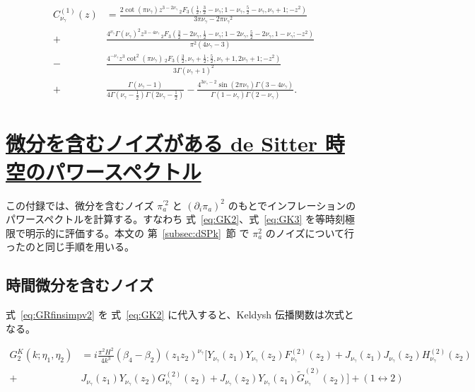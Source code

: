 \documentclass[a4paper,11pt]{ltjsarticle}
\newcommand{\sectionlink}[1]{\section[#1]{\hyperlink{toc}{#1}}}
\numberwithin{equation}{section}
\def\pia{\pi_{a}}
\newcommand{\Eq}[1]{Eq.~(\ref{#1})}
\newcommand{\Sec}[1]{Sec.~\ref{#1}}
\renewcommand{\Eq}[1]{式~\eqref{#1}}
\renewcommand{\Sec}[1]{第~\ref{#1}~節}
\begin{document}
\begin{align}
 \label{eq:Hbeta}
C^{(1)}_{\nu_\gamma}(z) &= \frac{2 \cot (\pi  {\nu_\gamma} ) z^{3-2 {\nu_\gamma} } \, _2F_3\left(\frac{1}{2},\frac{3}{2}-{\nu_\gamma} ;1-{\nu_\gamma} ,\frac{5}{2}-{\nu_\gamma} ,{\nu_\gamma} +1;-z^2\right)}{3 \pi  {\nu_\gamma} -2 \pi  {\nu_\gamma} ^2} \nonumber \\
+&\frac{4^{{\nu_\gamma} } \Gamma ({\nu_\gamma} )^2 z^{3-4 {\nu_\gamma} } \, _2F_3\left(\frac{3}{2}-2 {\nu_\gamma} ,\frac{1}{2}-{\nu_\gamma} ;1-2 {\nu_\gamma} ,\frac{5}{2}-2 {\nu_\gamma} ,1-{\nu_\gamma} ;-z^2\right)}{\pi ^2 (4 {\nu_\gamma} -3)}\nonumber\\
-&\frac{4^{-{\nu_\gamma} } z^3 \cot ^2(\pi  {\nu_\gamma} ) \, _2F_3\left(\frac{3}{2},{\nu_\gamma} +\frac{1}{2};\frac{5}{2},{\nu_\gamma} +1,2 {\nu_\gamma} +1;-z^2\right)}{3 \Gamma ({\nu_\gamma} +1)^2}\nonumber \\
+&\frac{\Gamma ({\nu_\gamma} -1)}{4 \Gamma \left({\nu_\gamma} -\frac{1}{2}\right) \Gamma \left(2 {\nu_\gamma} -\frac{1}{2}\right)}-\frac{4^{3 {\nu_\gamma} -2} \sin (2 \pi  {\nu_\gamma} ) \Gamma (3-4 {\nu_\gamma} )}{\Gamma (1-{\nu_\gamma} ) \Gamma (2-{\nu_\gamma} )}.
\end{align}

\sectionlink{微分を含むノイズがある de Sitter 時空のパワースペクトル}\label{app:Pk}

この付録では、微分を含むノイズ $\pia^{\prime2}$ と $\left(\partial_i\pia\right)^2$ のもとでインフレーションのパワースペクトルを計算する。すなわち \Eq{eq:GK2}、\Eq{eq:GK3} を等時刻極限で明示的に評価する。本文の \Sec{subsec:dSPk} で $\pia^2$ のノイズについて行ったのと同じ手順を用いる。

\subsection*{時間微分を含むノイズ}

\Eq{eq:GRfinsimpv2} を \Eq{eq:GK2} に代入すると、Keldysh 伝播関数は次式となる。

\begin{align}
    G^K_2(k;\eta_1,\eta_2) &= i\frac{\pi^2  H^2}{4 k^3} (\beta_4 - \beta_2 ) (z_1 z_2)^{\nu_\gamma} \bigg[ Y_{\nu_\gamma}(z_1) Y_{\nu_\gamma}(z_2) F^{(2)}_{\nu_\gamma}(z_2) + J_{\nu_\gamma}(z_1) J_{\nu_\gamma}(z_2) H^{(2)}_{\nu_\gamma}(z_2) \nonumber \\
    +& J_{\nu_\gamma}(z_1)Y_{\nu_\gamma}(z_2)G^{(2)}_{\nu_\gamma}(z_2) + J_{\nu_\gamma}(z_2)Y_{\nu_\gamma}(z_1)\tilde{G}^{(2)}_{\nu_\gamma}(z_2) \bigg] + (1 \leftrightarrow 2)
\end{align}
\end{document}

